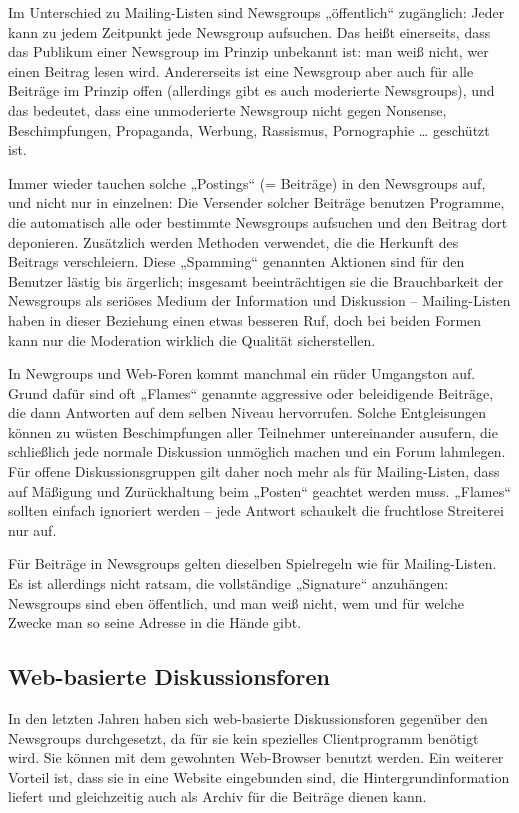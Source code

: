 \documentclass[]{book}
\theoremstyle{definition}
\theoremstyle{definition}
\theoremstyle{definition}
\theoremstyle{remark}
\begin{document}
Im Unterschied zu Mailing-Listen sind Newsgroups „öffentlich``
zugänglich: Jeder kann zu jedem Zeitpunkt jede Newsgroup aufsuchen. Das
heißt einerseits, dass das Publikum einer Newsgroup im Prinzip unbekannt
ist: man weiß nicht, wer einen Beitrag lesen wird. Andererseits ist eine
Newsgroup aber auch für alle Beiträge im Prinzip offen (allerdings gibt
es auch moderierte Newsgroups), und das bedeutet, dass eine unmoderierte
Newsgroup nicht gegen Nonsense, Beschimpfungen, Propaganda, Werbung,
Rassismus, Pornographie \ldots{} geschützt ist.

Immer wieder tauchen solche „Postings`` (= Beiträge) in den Newsgroups
auf, und nicht nur in einzelnen: Die Versender solcher Beiträge benutzen
Programme, die automatisch alle oder bestimmte Newsgroups aufsuchen und
den Beitrag dort deponieren. Zusätzlich werden Methoden verwendet, die
die Herkunft des Beitrags verschleiern. Diese „Spamming`` genannten
Aktionen sind für den Benutzer lästig bis ärgerlich; insgesamt
beeinträchtigen sie die Brauchbarkeit der Newsgroups als seriöses Medium
der Information und Diskussion -- Mailing-Listen haben in dieser
Beziehung einen etwas besseren Ruf, doch bei beiden Formen kann nur die
Moderation wirklich die Qualität sicherstellen.

In Newgroups und Web-Foren kommt manchmal ein rüder Umgangston auf.
Grund dafür sind oft „Flames`` genannte aggressive oder beleidigende
Beiträge, die dann Antworten auf dem selben Niveau hervorrufen. Solche
Entgleisungen können zu wüsten Beschimpfungen aller Teilnehmer
untereinander ausufern, die schließlich jede normale Diskussion
unmöglich machen und ein Forum lahmlegen. Für offene Diskussionsgruppen
gilt daher noch mehr als für Mailing-Listen, dass auf Mäßigung und
Zurückhaltung beim „Posten`` geachtet werden muss. „Flames`` sollten
einfach ignoriert werden -- jede Antwort schaukelt die fruchtlose
Streiterei nur auf.

Für Beiträge in Newsgroups gelten dieselben Spielregeln wie für
Mailing-Listen. Es ist allerdings nicht ratsam, die vollständige
„Signature`` anzuhängen: Newsgroups sind eben öffentlich, und man weiß
nicht, wem und für welche Zwecke man so seine Adresse in die Hände gibt.

\subsection{Web-basierte
Diskussionsforen}\label{web-basierte-diskussionsforen}

In den letzten Jahren haben sich web-basierte Diskussionsforen gegenüber
den Newsgroups durchgesetzt, da für sie kein spezielles Clientprogramm
benötigt wird. Sie können mit dem gewohnten Web-Browser benutzt werden.
Ein weiterer Vorteil ist, dass sie in eine Website eingebunden sind, die
Hintergrundinformation liefert und gleichzeitig auch als Archiv für die
Beiträge dienen kann.
\end{document}
